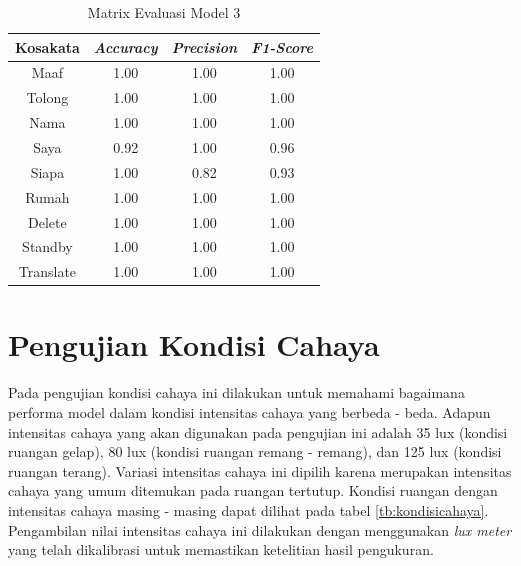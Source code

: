 \begin{longtable}{|c|c|c|c|}
  \caption{Matrix Evaluasi Model 3}
  \label{tb:model3stat}                                   \\
  \hline
  \rowcolor[HTML]{C0C0C0}
  \textbf{Kosakata} & \textbf{\emph{Accuracy}} & \textbf{\emph{Precision}} & \textbf{\emph{F1-Score}} \\
  \hline
  Maaf              & 1.00                        & 1.00                   & 1.00                \\
  Tolong            & 1.00                        & 1.00                   & 1.00                \\
  Nama              & 1.00                        & 1.00                   & 1.00                \\
  Saya              & 0.92                        & 1.00                   & 0.96                \\
  Siapa             & 1.00                        & 0.82                   & 0.93                \\
  Rumah             & 1.00                        & 1.00                   & 1.00                \\
  Delete            & 1.00                        & 1.00                   & 1.00                \\
  Standby           & 1.00                        & 1.00                   & 1.00                \\
  Translate         & 1.00                        & 1.00                   & 1.00                \\
  \hline
\end{longtable}

\section{Pengujian Kondisi Cahaya}
\label{sec:analisiscahaya}

Pada pengujian kondisi cahaya ini dilakukan untuk memahami bagaimana performa model dalam kondisi intensitas cahaya  yang berbeda - beda. Adapun intensitas cahaya yang akan digunakan pada pengujian ini adalah 35 lux (kondisi ruangan gelap), 80 lux (kondisi ruangan remang - remang), dan 125 lux (kondisi ruangan terang). Variasi intensitas cahaya ini dipilih karena merupakan intensitas cahaya yang umum ditemukan pada ruangan tertutup. Kondisi ruangan dengan intensitas cahaya masing - masing dapat dilihat pada tabel \ref{tb:kondisicahaya}. Pengambilan nilai intensitas cahaya ini dilakukan dengan menggunakan \emph{lux meter} yang telah dikalibrasi untuk memastikan ketelitian hasil pengukuran.

